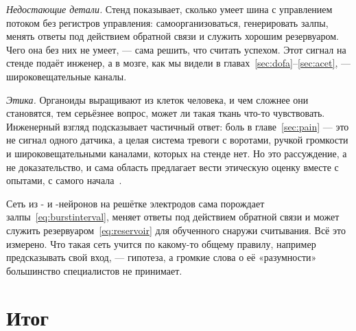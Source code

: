\emph{Недостающие детали.} Стенд показывает, сколько умеет шина  с управлением потоком  без регистров управления: самоорганизоваться, генерировать залпы, менять ответы под действием обратной связи и служить хорошим резервуаром. Чего она без них не умеет, --- сама решить, что считать успехом. Этот сигнал на стенде подаёт инженер, а в мозге, как мы видели в главах~\ref{sec:dofa}--\ref{sec:acet}, --- широковещательные каналы.

\emph{Этика.} Органоиды выращивают из клеток человека, и чем сложнее они становятся, тем серьёзнее вопрос, может ли такая ткань что-то чувствовать. Инженерный взгляд подсказывает частичный ответ: боль в главе~\ref{sec:pain} --- это не сигнал одного датчика, а целая система тревоги с воротами, ручкой громкости и широковещательными каналами, которых на стенде нет. Но это рассуждение, а не доказательство, и сама область предлагает вести этическую оценку вместе с опытами, с самого начала~\cite{Smirnova2023}.

\begin{keyblock}
\begin{proposition}
\label{prop:livingmachine}
Сеть из - и -нейронов на решётке электродов сама порождает залпы~\eqref{eq:burstinterval}, меняет ответы под действием обратной связи и может служить резервуаром~\eqref{eq:reservoir} для обученного снаружи считывания. Всё это измерено. Что такая сеть учится по какому-то общему правилу, например предсказывать свой вход, --- гипотеза, а громкие слова о её «разумности» большинство специалистов не принимает.
\end{proposition}
\end{keyblock}



\section{Итог}

